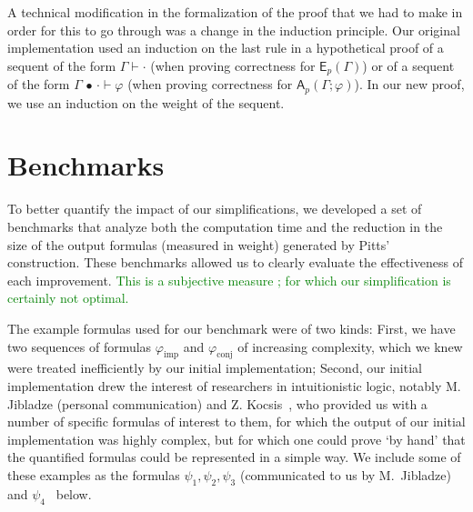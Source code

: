 \documentclass[english,review]{jflart}
\theoremstyle{definition}
\theoremstyle{plain}
\newcommand{\Ap}[1]{\mathsf{A}_{p}(#1)}
\newcommand{\Ep}[1]{\mathsf{E}_{p}(#1)}
\renewcommand{\phi}{\varphi}
\newcommand{\cons}{\,\bullet\,}
\newcommand{\hugo}[1]{\textcolor{green}{#1}}
\begin{document}
A technical modification in the formalization of the proof that we had to make in order for this to go through was a change in the induction principle. Our original implementation used an induction on the last rule in a hypothetical proof of a sequent of the form $\Gamma \vdash \cdot$ (when proving correctness for $\Ep{\Gamma}$) or of a sequent of the form $\Gamma \cons \cdot \vdash \phi$ (when proving correctness for $\Ap{\Gamma; \phi}$). In our new proof, we use an induction on the weight of the sequent.






\section{Benchmarks}\label{sec:benchmarks}
To better quantify the impact of our simplifications, we developed a set of benchmarks that analyze both the computation time and the reduction 
in the size of the output formulas (measured in weight) generated by Pitts' construction. These benchmarks allowed us to clearly evaluate the 
effectiveness of each improvement.
\hugo{This is a subjective measure ; for which our simplification is certainly not optimal.}

The example formulas used for our benchmark were of two kinds: First, we have two sequences of formulas $\phi_{\text{imp}}$ and $\phi_{\text{conj}}$ of increasing complexity, which we knew were treated inefficiently by our initial implementation; Second, our initial implementation drew the interest of researchers in intuitionistic logic, notably M. Jibladze (personal communication) and Z. Kocsis~\cite{Koc2023}, who provided us with a number of specific formulas of interest to them, for which the output of our initial implementation was highly complex, but for which one could prove `by hand' that the quantified formulas could be represented in a simple way. We include some of these examples as the formulas $\psi_1, \psi_2, \psi_3$ (communicated to us by M.~Jibladze) and $\psi_4$~\cite[3.13]{Koc2023} below.
\end{document}
